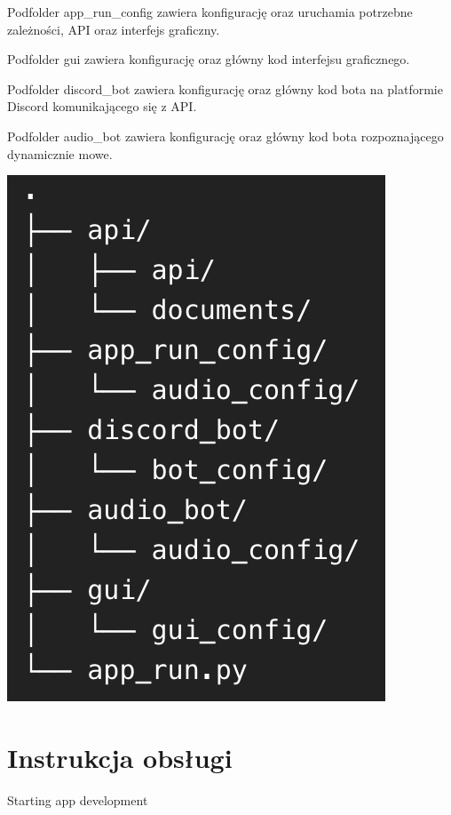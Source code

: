 \documentclass[polish]{article}
\begin{document}
        Podfolder app\_run\_config zawiera konfigurację oraz uruchamia potrzebne zależności, API oraz interfejs graficzny.
        
        Podfolder gui zawiera konfigurację oraz główny kod interfejsu graficznego.
        
        Podfolder discord\_bot zawiera konfigurację oraz główny kod bota na platformie Discord komunikającego się z API.
        
        Podfolder audio\_bot zawiera konfigurację oraz główny kod bota rozpoznającego dynamicznie mowe.

        \begin{center}

          \includegraphics{tree.png}

        \end{center}


	\section{Instrukcja obsługi}
	
		Starting app development
		
\end{document}
